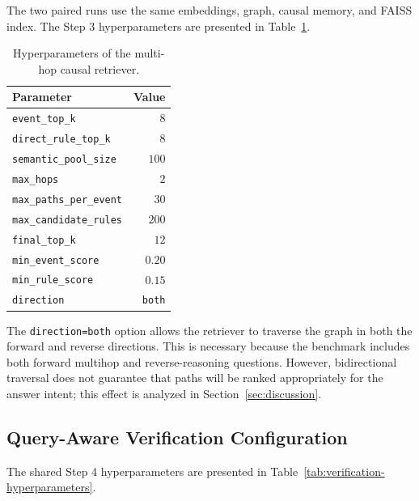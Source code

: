 The two paired runs use the same embeddings, graph, causal memory, and FAISS
index. The Step 3 hyperparameters are presented in
Table~\ref{tab:retrieval-hyperparameters}.

\begin{table}[t]
    \centering
    \caption{Hyperparameters of the multi-hop causal retriever.}
    \label{tab:retrieval-hyperparameters}
    \begin{tabular}{lr}
        \hline
        \textbf{Parameter} & \textbf{Value} \\
        \hline
        \texttt{event\_top\_k} & \(8\) \\
        \texttt{direct\_rule\_top\_k} & \(8\) \\
        \texttt{semantic\_pool\_size} & \(100\) \\
        \texttt{max\_hops} & \(2\) \\
        \texttt{max\_paths\_per\_event} & \(30\) \\
        \texttt{max\_candidate\_rules} & \(200\) \\
        \texttt{final\_top\_k} & \(12\) \\
        \texttt{min\_event\_score} & \(0.20\) \\
        \texttt{min\_rule\_score} & \(0.15\) \\
        \texttt{direction} & \texttt{both} \\
        \hline
    \end{tabular}
\end{table}

The \texttt{direction=both} option allows the retriever to traverse the graph
in both the forward and reverse directions. This is necessary because the
benchmark includes both forward multihop and reverse-reasoning questions.
However, bidirectional traversal does not guarantee that paths will be ranked
appropriately for the answer intent; this effect is analyzed in
Section~\ref{sec:discussion}.

\subsection{Query-Aware Verification Configuration}

The shared Step 4 hyperparameters are presented in
Table~\ref{tab:verification-hyperparameters}.

